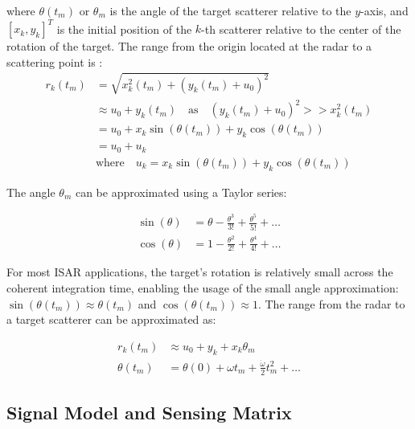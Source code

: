 \documentclass[]{spie}  %
\begin{document}
\noindent where $\theta(t_{m})$ or $\theta_m$ is the angle of the target scatterer relative to the $y$-axis, and $[x_{k}, y_{k}]^{T}$ is the initial position of the $k$-th scatterer relative to the center of the rotation of the target. The range from the origin located at the radar to a scattering point is \cite{Xu2022}:
\begin{equation}
    \begin{aligned}
        r_{k}(t_m) &= \sqrt{x_{k}^2(t_m) + (y_k(t_{m}) + u_{0})^2}\\
        &\approx u_{0} + y_{k}(t_m) \quad \mathrm{as} \quad (y_k(t_{m}) + u_{0})^2 >> x_{k}^2(t_m)\\
        &= u_{0} + x_{k} \sin(\theta(t_{m})) + y_{k}\cos(\theta(t_{m}))\\
        &= u_{0} + u_{k} \\ &\mathrm{where} \quad u_{k} = x_{k} \sin(\theta(t_{m})) + y_{k}\cos(\theta(t_{m}))
    \end{aligned} 
    \label{eq:r}
\end{equation}

\noindent The angle $\theta_m$ can be approximated using a Taylor series:

\begin{equation}
    \begin{aligned}
        \sin(\theta) &= \theta - \frac{\theta^3}{3!} + \frac{\theta^{5}}{5!} + \dots \\
        \cos(\theta) &= 1 - \frac{\theta^2}{2!} + \frac{\theta^{4}}{4!} + \dots
    \end{aligned}
\end{equation}

\noindent For most ISAR applications, the target's rotation is relatively small across the coherent integration time, enabling the usage of the small angle approximation: $\sin(\theta(t_{m})) \approx\theta(t_{m})$ and $\cos(\theta(t_m)) \approx 1$. The range from the radar to a target scatterer can be approximated as:

\begin{equation}
  \begin{aligned}
    r_{k}(t_{m}) &\approx u_{0} + y_{k} + x_{k}\theta_{m} \\ \theta(t_{m}) &= \theta(0) + \omega t_{m} + \frac{\dot{\omega}}{2}t_{m}^{2} + \dots
  \end{aligned}
  \label{eq:r_final}
\end{equation}

\subsection{Signal Model and Sensing Matrix} \label{sec:signal} 
\end{document}
